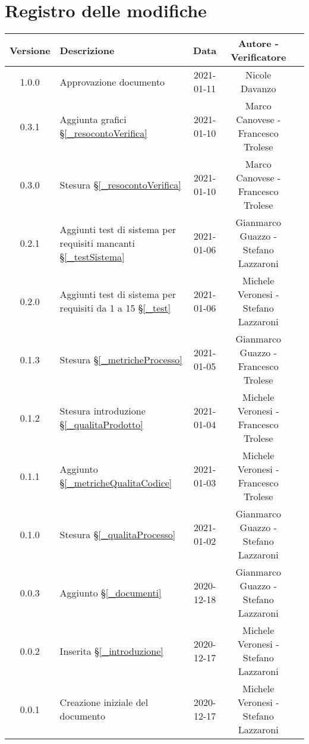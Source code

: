 \section*{Registro delle modifiche}

\begin{center}
	\begin{longtable}{|c|p{5cm}|c|c|c|}
	\hline
	\rowcolor{lighter-grayer}
	\textbf{Versione} & \textbf{Descrizione} & \textbf{Data} & \textbf{Autore - Verificatore} \\
	\hline
	\endfirsthead


	\hline
	1.0.0 & Approvazione documento & 2021-01-11 & Nicole Davanzo \\
	0.3.1 & Aggiunta grafici \S\ref{_resocontoVerifica} & 2021-01-10 & Marco Canovese - Francesco Trolese \\
	0.3.0 & Stesura \S\ref{_resocontoVerifica} & 2021-01-10 & Marco Canovese - Francesco Trolese \\
	0.2.1 & Aggiunti test di sistema per requisiti mancanti \S\ref{_testSistema}& 2021-01-06 & Gianmarco Guazzo - Stefano Lazzaroni \\
	0.2.0 & Aggiunti test di sistema per requisiti da 1 a 15 \S\ref{_test}& 2021-01-06 & Michele Veronesi - Stefano Lazzaroni \\
	0.1.3 & Stesura \S\ref{_metricheProcesso} & 2021-01-05 & Gianmarco Guazzo - Francesco Trolese \\
	0.1.2 & Stesura introduzione \S\ref{_qualitaProdotto}& 2021-01-04 & Michele Veronesi - Francesco Trolese \\
	0.1.1 & Aggiunto \S\ref{_metricheQualitaCodice} & 2021-01-03 & Michele Veronesi - Francesco Trolese \\
	0.1.0 & Stesura \S\ref{_qualitaProcesso} & 2021-01-02 & Gianmarco Guazzo - Stefano Lazzaroni \\
	0.0.3 & Aggiunto \S\ref{_documenti} & 2020-12-18 & Gianmarco Guazzo - Stefano Lazzaroni \\
	0.0.2 & Inserita \S\ref{_introduzione} & 2020-12-17 &  Michele Veronesi - Stefano Lazzaroni\\
    0.0.1 & Creazione iniziale del documento & 2020-12-17 & Michele Veronesi - Stefano Lazzaroni\\
	\hline

	\end{longtable}
\end{center}